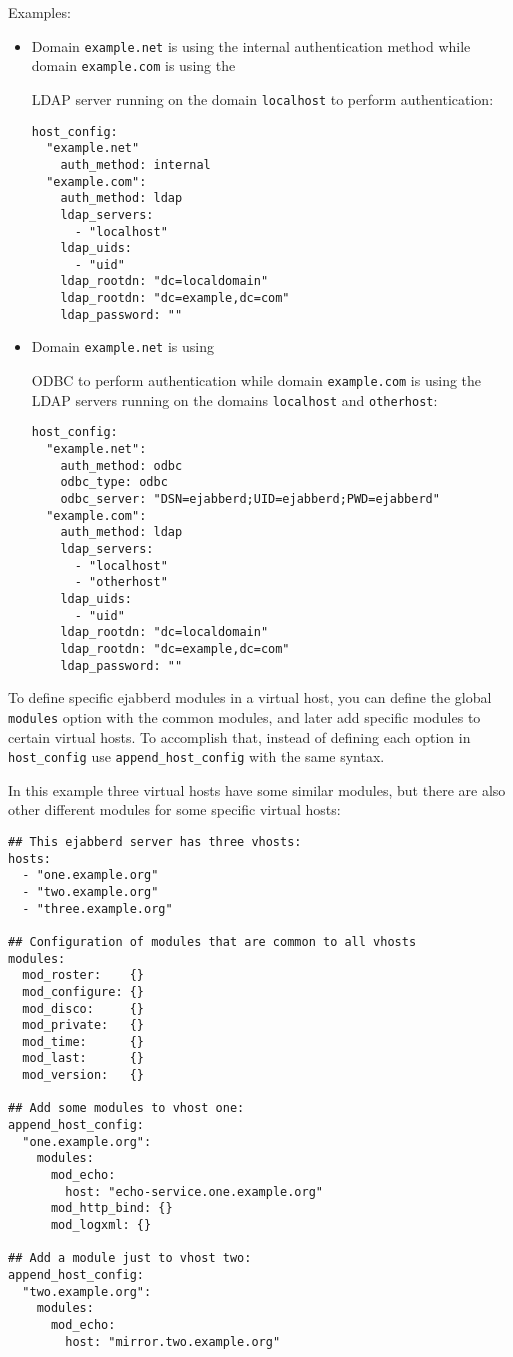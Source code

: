 \documentclass[a4paper,10pt]{book}
\newcommand{\ind}[1]{\begin{latexonly}\index{#1}\end{latexonly}}
\newcommand{\jid}[1]{\texttt{#1}}
\newcommand{\term}[1]{\texttt{#1}}
\begin{document}
Examples:
\begin{itemize}
\item Domain \jid{example.net} is using the internal authentication method while
  domain \jid{example.com} is using the \ind{LDAP}LDAP server running on the
  domain \jid{localhost} to perform authentication:
\begin{verbatim}
host_config:
  "example.net"
    auth_method: internal
  "example.com":
    auth_method: ldap
    ldap_servers:
      - "localhost"
    ldap_uids:
      - "uid"
    ldap_rootdn: "dc=localdomain"
    ldap_rootdn: "dc=example,dc=com"
    ldap_password: ""
\end{verbatim}
\item Domain \jid{example.net} is using \ind{odbc}ODBC to perform authentication
  while domain \jid{example.com} is using the LDAP servers running on the domains
  \jid{localhost} and \jid{otherhost}:
\begin{verbatim}
host_config:
  "example.net":
    auth_method: odbc
    odbc_type: odbc
    odbc_server: "DSN=ejabberd;UID=ejabberd;PWD=ejabberd"
  "example.com":
    auth_method: ldap
    ldap_servers:
      - "localhost"
      - "otherhost"
    ldap_uids:
      - "uid"
    ldap_rootdn: "dc=localdomain"
    ldap_rootdn: "dc=example,dc=com"
    ldap_password: ""
\end{verbatim}
\end{itemize}

To define specific ejabberd modules in a virtual host,
you can define the global \term{modules} option with the common modules,
and later add specific modules to certain virtual hosts.
To accomplish that, instead of defining each option in \term{host\_config}
use \term{append\_host\_config} with the same syntax.

In this example three virtual hosts have some similar modules, but there are also
other different modules for some specific virtual hosts:
\begin{verbatim}
## This ejabberd server has three vhosts:
hosts:
  - "one.example.org"
  - "two.example.org"
  - "three.example.org"

## Configuration of modules that are common to all vhosts
modules:
  mod_roster:    {}
  mod_configure: {}
  mod_disco:     {}
  mod_private:   {}
  mod_time:      {}
  mod_last:      {}
  mod_version:   {}

## Add some modules to vhost one:
append_host_config:
  "one.example.org":
    modules:
      mod_echo:
        host: "echo-service.one.example.org"
      mod_http_bind: {}
      mod_logxml: {}

## Add a module just to vhost two:
append_host_config:
  "two.example.org":
    modules:
      mod_echo:
        host: "mirror.two.example.org"
\end{verbatim}
\end{document}
